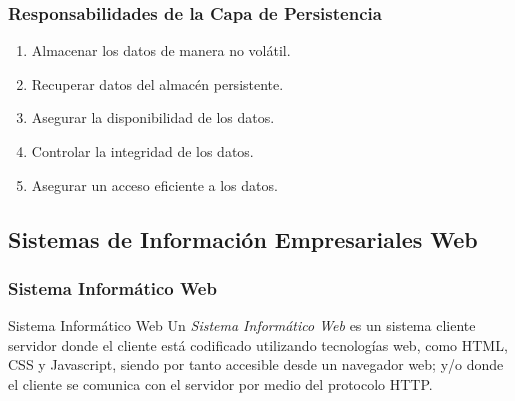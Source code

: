 \documentclass[handout,a4paper,t,xcolor=pst,dvips,colortheme]{beamer}
\begin{document}
\begin{frame}[c]
	\frametitle{Responsabilidades de la Capa de Persistencia}
	\begin{enumerate}[<+->]
        \item Almacenar los datos de manera no volátil.
        \item Recuperar datos del almacén persistente.
        \item Asegurar la disponibilidad de los datos.
        \item Controlar la integridad de los datos.
        \item Asegurar un acceso eficiente a los datos.
	\end{enumerate}
\end{frame}

\subsection[SIEs Web]{Sistemas de Información Empresariales Web}

\begin{frame}[c]
    \frametitle{Sistema Informático Web}
    \begin{block}{Sistema Informático Web}
        Un \emph{Sistema Informático Web} es un sistema cliente servidor donde el cliente está codificado utilizando tecnologías web, como HTML, CSS y Javascript, siendo por tanto accesible desde un navegador web; y/o donde el cliente se comunica con el servidor por medio del protocolo HTTP.
    \end{block}
\end{frame}
\end{document}
